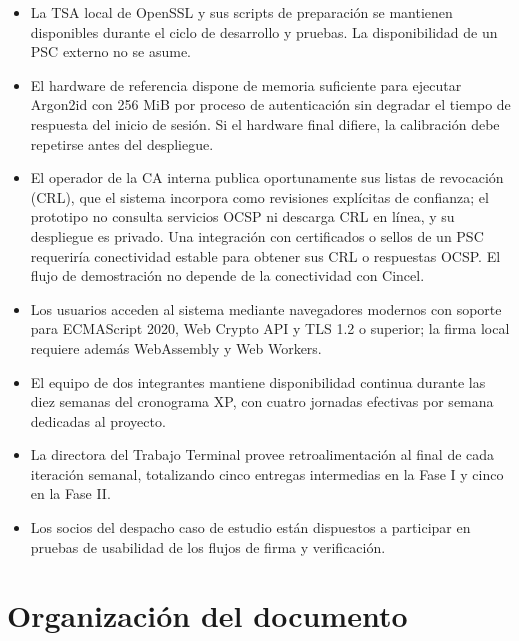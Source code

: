 \begin{itemize}
  \item La TSA local de OpenSSL y sus scripts de preparación se mantienen disponibles durante el ciclo de desarrollo y pruebas. La disponibilidad de un PSC externo no se asume.

  \item El hardware de referencia dispone de memoria suficiente para ejecutar Argon2id con 256 MiB por proceso de autenticación sin degradar el tiempo de respuesta del inicio de sesión. Si el hardware final difiere, la calibración debe repetirse antes del despliegue.

  \item El operador de la CA interna publica oportunamente sus listas de revocación (CRL), que el sistema incorpora como revisiones explícitas de confianza; el prototipo no consulta servicios OCSP ni descarga CRL en línea, y su despliegue es privado. Una integración con certificados o sellos de un PSC requeriría conectividad estable para obtener sus CRL o respuestas OCSP. El flujo de demostración no depende de la conectividad con Cincel.

  \item Los usuarios acceden al sistema mediante navegadores modernos con soporte para ECMAScript 2020, Web Crypto API y TLS 1.2 o superior; la firma local requiere además WebAssembly y Web Workers.

  \item El equipo de dos integrantes mantiene disponibilidad continua durante las diez semanas del cronograma XP, con cuatro jornadas efectivas por semana dedicadas al proyecto.

  \item La directora del Trabajo Terminal provee retroalimentación al final de cada iteración semanal, totalizando cinco entregas intermedias en la Fase I y cinco en la Fase II.

  \item Los socios del despacho caso de estudio están dispuestos a participar en pruebas de usabilidad de los flujos de firma y verificación.
\end{itemize}

\section{Organización del documento}\label{sec:organizacion}

